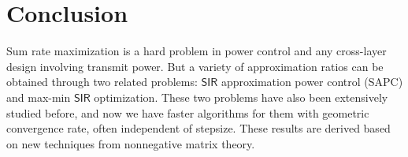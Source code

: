 \documentclass[10pt,twocolumn]{IEEEtran}
\newcommand{\0}{\mathbf{0}}
\newcommand{\1}{\mathbf{1}}
\begin{document}
%
%
%
%

\section{Conclusion}
Sum rate maximization is a hard problem in power control and any cross-layer design involving transmit power. But a variety of approximation ratios can be obtained through two related problems: $\mathsf{SIR}$ approximation power control (SAPC) and max-min $\mathsf{SIR}$ optimization. These two problems have also been extensively studied before, and now we have faster algorithms for them with geometric convergence rate, often independent of stepsize. These results are derived based on new techniques from nonnegative matrix theory. 
\end{document}
